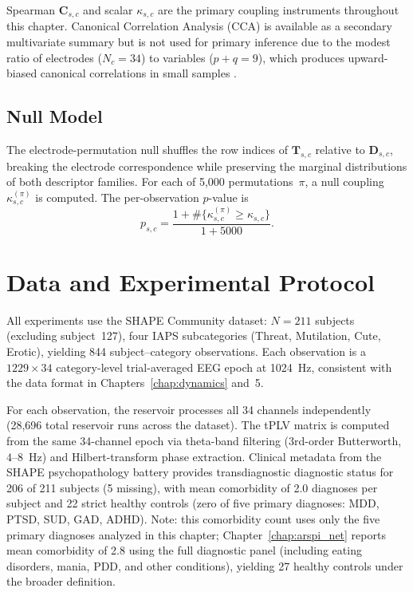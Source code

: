 Spearman $\mathbf{C}_{s,c}$ and scalar $\kappa_{s,c}$ are the primary coupling instruments throughout this chapter. Canonical Correlation Analysis (CCA) is available as a secondary multivariate summary but is not used for primary inference due to the modest ratio of electrodes ($N_c = 34$) to variables ($p + q = 9$), which produces upward-biased canonical correlations in small samples \cite{wang_cca_2020}.

\subsection{Null Model}

The electrode-permutation null shuffles the row indices of $\mathbf{T}_{s,c}$ relative to $\mathbf{D}_{s,c}$, breaking the electrode correspondence while preserving the marginal distributions of both descriptor families. For each of 5,000 permutations~$\pi$, a null coupling $\kappa_{s,c}^{(\pi)}$ is computed. The per-observation $p$-value is
\begin{equation}
p_{s,c} = \frac{1 + \#\{\kappa_{s,c}^{(\pi)} \ge \kappa_{s,c}\}}{1 + 5000}.
\end{equation}


\section{Data and Experimental Protocol}
\label{sec:ch7_protocol}

All experiments use the SHAPE Community dataset: $N = 211$ subjects (excluding subject~127), four IAPS subcategories (Threat, Mutilation, Cute, Erotic), yielding 844 subject--category observations. Each observation is a $1229 \times 34$ category-level trial-averaged EEG epoch at 1024~Hz, consistent with the data format in Chapters~\ref{chap:dynamics} and~5.

For each observation, the reservoir processes all 34 channels independently (28,696 total reservoir runs across the dataset). The tPLV matrix is computed from the same 34-channel epoch via theta-band filtering (3rd-order Butterworth, $4$--$8$~Hz) and Hilbert-transform phase extraction. Clinical metadata from the SHAPE psychopathology battery provides transdiagnostic diagnostic status for 206 of 211 subjects (5 missing), with mean comorbidity of 2.0 diagnoses per subject and 22 strict healthy controls (zero of five primary diagnoses: MDD, PTSD, SUD, GAD, ADHD). Note: this comorbidity count uses only the five primary diagnoses analyzed in this chapter; Chapter~\ref{chap:arspi_net} reports mean comorbidity of 2.8 using the full diagnostic panel (including eating disorders, mania, PDD, and other conditions), yielding 27 healthy controls under the broader definition.

